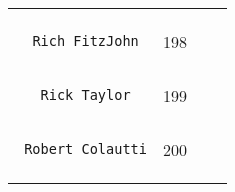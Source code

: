 \documentclass[]{article}
\begin{document}
\begin{longtable}[c]{@{}llll@{}}
\begin{minipage}[t]{0.13\columnwidth}
\end{minipage} & \begin{minipage}[t]{0.15\columnwidth}\raggedright
\end{minipage}
\\\noalign{\medskip}
\begin{minipage}[t]{0.39\columnwidth}\raggedright
\begin{verbatim}
  Rich FitzJohn
\end{verbatim}
\end{minipage} & \begin{minipage}[t]{0.10\columnwidth}\raggedright
198
\end{minipage} & \begin{minipage}[t]{0.13\columnwidth}\raggedright
\end{minipage} & \begin{minipage}[t]{0.15\columnwidth}\raggedright
\end{minipage}
\\\noalign{\medskip}
\begin{minipage}[t]{0.39\columnwidth}\raggedright
\begin{verbatim}
   Rick Taylor
\end{verbatim}
\end{minipage} & \begin{minipage}[t]{0.10\columnwidth}\raggedright
199
\end{minipage} & \begin{minipage}[t]{0.13\columnwidth}\raggedright
\end{minipage} & \begin{minipage}[t]{0.15\columnwidth}\raggedright
\end{minipage}
\\\noalign{\medskip}
\begin{minipage}[t]{0.39\columnwidth}\raggedright
\begin{verbatim}
 Robert Colautti
\end{verbatim}
\end{minipage} & \begin{minipage}[t]{0.10\columnwidth}\raggedright
200
\end{minipage} & \begin{minipage}[t]{0.13\columnwidth}\raggedright
\end{minipage} & \begin{minipage}[t]{0.15\columnwidth}\raggedright
\end{minipage}
\\\noalign{\medskip}

\end{longtable}
\end{document}
